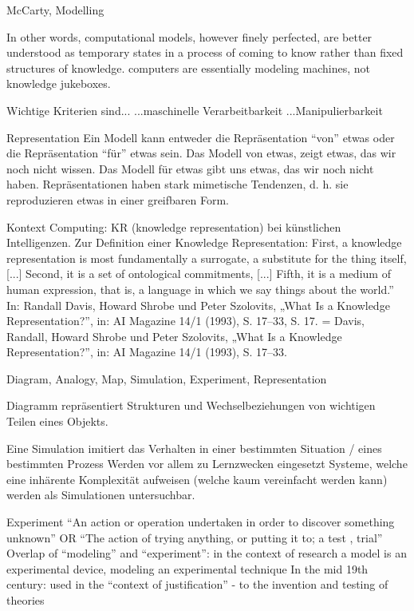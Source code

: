 \begin{frame}[allowframebreaks]{McCarty, Modelling}
\begin{block}{\cite[257]{mccarty2004}}
\footnotesize
In other words, computational models, however finely perfected, are better understood as temporary states in a process of coming to
know rather than fixed structures of knowledge. \punkti computers are essentially modeling machines, not knowledge jukeboxes.
\end{block}
\framebreak


Wichtige Kriterien sind...
...maschinelle Verarbeitbarkeit
...Manipulierbarkeit

Representation
Ein Modell kann entweder die Repräsentation “von” etwas oder die Repräsentation “für”
etwas sein.
Das Modell von etwas, zeigt etwas, das wir noch nicht wissen. Das Modell für etwas gibt
uns etwas, das wir noch nicht haben.
Repräsentationen haben stark mimetische Tendenzen, d. h. sie reproduzieren etwas in
einer greifbaren Form.

Kontext Computing: KR (knowledge representation) bei künstlichen Intelligenzen.
Zur Definition einer Knowledge Representation: First, a knowledge representation is
most fundamentally a surrogate, a substitute for the thing itself, [...] Second, it is a set of
ontological commitments, [...] Fifth, it is a medium of human expression, that is, a language
in which we say things about the world.” In: Randall Davis, Howard Shrobe und Peter Szolovits,
„What Is a Knowledge Representation?”, in: AI Magazine 14/1 (1993), S. 17–33, S. 17. = Davis, Randall,
Howard Shrobe und Peter Szolovits, „What Is a Knowledge Representation?”, in: AI Magazine 14/1
(1993), S. 17–33.

Diagram, Analogy, Map, Simulation, Experiment, Representation

Diagramm repräsentiert Strukturen und Wechselbeziehungen von wichtigen Teilen
eines Objekts.

Eine Simulation imitiert das Verhalten in einer bestimmten Situation / eines
bestimmten Prozess
Werden vor allem zu Lernzwecken eingesetzt
Systeme, welche eine inhärente Komplexität aufweisen (welche kaum vereinfacht
werden kann) werden als Simulationen untersuchbar.

Experiment 
“An action or operation undertaken in order to discover something unknown”
OR “The action of trying anything, or putting it to; a test , trial”
Overlap of “modeling” and “experiment”: in the context of research a model is
an experimental device, modeling an experimental technique
In the mid 19th century: used in the “context of justification” - to the invention
and testing of theories

\end{frame}


